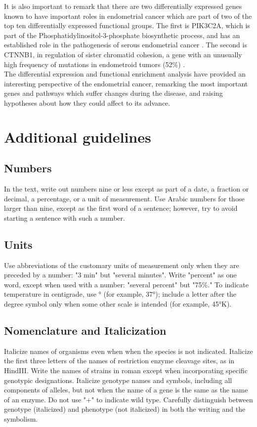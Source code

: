 \documentclass[9pt,twocolumn,twoside]{gsajnl}
\begin{document}
It is also important to remark that there are two differentially expressed genes known to have important roles in endometrial cancer which are part of two of the top ten differentially expressed functional groups. The first is PIK3C2A, which is part of the Phosphatidylinositol-3-phosphate biosynthetic process, and has an established role in the pathogenesis of serous endometrial cancer \citep{LeGallo2012}. The second is CTNNB1, in regulation of sister chromatid cohesion, a gene with an unusually high frequency of mutations in endometroid tumors (52\%) \citep{Getz2013}. \\

The differential expression and functional enrichment analysis have provided an interesting perspective of the endometrial cancer, remarking the most important genes and pathways which suffer changes during the disease, and raising hypotheses about how they could affect to its advance. 

\section*{Additional guidelines}

\subsection*{Numbers} In the text, write out numbers nine or less except as part of a date, a fraction or decimal, a percentage, or a unit of measurement. Use Arabic numbers for those larger than nine, except as the first word of a sentence; however, try to avoid starting a sentence with such a number.

\subsection*{Units} Use abbreviations of the customary units of measurement only when they are preceded by a number: "3 min" but "several minutes". Write "percent" as one word, except when used with a number: "several percent" but "75\%." To indicate temperature in centigrade, use ° (for example, 37°); include a letter after the degree symbol only when some other scale is intended (for example, 45°K).

\subsection*{Nomenclature and Italicization} Italicize names of organisms even when  when the species is not indicated. Italicize the first three letters of the names of restriction enzyme cleavage sites, as in HindIII. Write the names of strains in roman except when incorporating specific genotypic designations. Italicize genotype names and symbols, including all components of alleles, but not when the name of a gene is the same as the name of an enzyme. Do not use "+" to indicate wild type. Carefully distinguish between genotype (italicized) and phenotype (not italicized) in both the writing and the symbolism.
\end{document}
